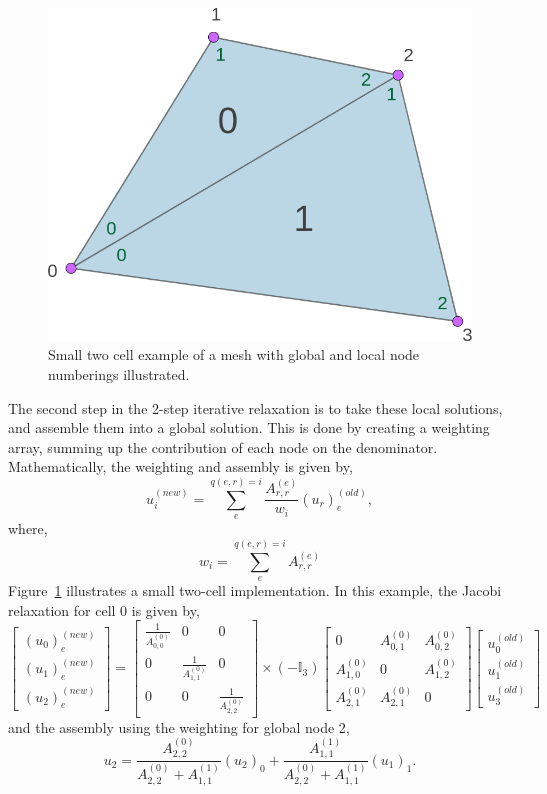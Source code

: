 \begin{figure}
	\centering
	\includegraphics[width = 0.35\linewidth]{Figures/2cell2.png}
	\caption{Small two cell example of a mesh with global and local node numberings illustrated.}
	\label{fig:2cell2}
\end{figure}
The second step in the 2-step iterative relaxation is to take these local solutions, and assemble them into a global solution. This is done by creating a weighting array, summing up the contribution of each node on the denominator. Mathematically, the weighting and assembly is given by,
\begin{equation}\label{weight}
	u_i^{(new)} = \sum_e^{q(e,r) = i}\frac{A^{(e)}_{r,r}}{w_i} (u_r)_e^{(old)},
\end{equation}
where,
\begin{equation}
	w_i = \sum_e^{q(e,r) = i}A^{(e)}_{r,r}
\end{equation}
Figure~\ref{fig:2cell2} illustrates a small two-cell implementation. In this example, the Jacobi relaxation for cell 0 is given by,
\begin{equation}
	\left[\begin{matrix}
		(u_0)_e^{(new)} \\
		(u_1)_e^{(new)} \\
		(u_2)_e^{(new)}
	\end{matrix}\right] = 
	\left[\begin{matrix}
		\frac{1}{A^{(0)}_{0,0}} & 0 & 0 \\
		0 & \frac{1}{A^{(0)}_{1,1}} & 0 \\
		0 & 0 & \frac{1}{A^{(0)}_{2,2}}
	\end{matrix} \right]
	\times (-\mathbb{I}_3)
	\left[\begin{matrix}
		0 & A^{(0)}_{0,1} & A^{(0)}_{0,2} \\
		A^{(0)}_{1,0} & 0 & A^{(0)}_{1,2} \\
		A^{(0)}_{2,1} & A^{(0)}_{2,1} & 0 
	\end{matrix}\right]
	\left[\begin{matrix}
		u_0^{(old)} \\
		u_1^{(old)} \\
		u_3^{(old)}
	\end{matrix}\right]
\end{equation}
and the assembly using the weighting for global node 2,
\begin{equation}
	u_2 = \frac{A^{(0)}_{2,2}}{A^{(0)}_{2,2} + A^{(1)}_{1,1} } (u_2)_0 + \frac{A^{(1)}_{1,1}}{A^{(0)}_{2,2} + A^{(1)}_{1,1} } (u_1)_1.
\end{equation}

